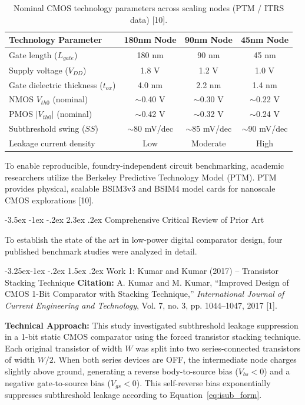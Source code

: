 \documentclass[12pt,a4paper,oneside]{report}
\makeatletter
\renewcommand\section{\@startsection {section}{1}{\z@}%
                                   {-3.5ex \@plus -1ex \@minus -.2ex}%
                                   {2.3ex \@plus.2ex}%
                                   {\normalfont\normalsize\bfseries}}
\renewcommand\subsection{\@startsection{subsection}{2}{\z@}%
                                     {-3.25ex\@plus -1ex \@minus -.2ex}%
                                     {1.5ex \@plus .2ex}%
                                     {\normalfont\normalsize\bfseries\itshape}}
\makeatother
\begin{document}
\begin{table}[H]
\centering
\caption{Nominal CMOS technology parameters across scaling nodes (PTM / ITRS data) [10].}
\label{tab:tech_roadmap}
\vspace{0.2cm}
\begin{tabular}{|l|c|c|c|}
\hline
\textbf{Technology Parameter} & \textbf{180nm Node} & \textbf{90nm Node} & \textbf{45nm Node} \\
\hline
Gate length ($L_{gate}$) & 180 nm & 90 nm & 45 nm \\
\hline
Supply voltage ($V_{DD}$) & 1.8 V & 1.2 V & 1.0 V \\
\hline
Gate dielectric thickness ($t_{ox}$) & 4.0 nm & 2.2 nm & 1.4 nm \\
\hline
NMOS $V_{th0}$ (nominal) & $\sim$0.40 V & $\sim$0.30 V & $\sim$0.22 V \\
\hline
PMOS $|V_{th0}|$ (nominal) & $\sim$0.42 V & $\sim$0.32 V & $\sim$0.24 V \\
\hline
Subthreshold swing ($SS$) & $\sim$80 mV/dec & $\sim$85 mV/dec & $\sim$90 mV/dec \\
\hline
Leakage current density & Low & Moderate & High \\
\hline
\end{tabular}
\end{table}

To enable reproducible, foundry-independent circuit benchmarking, academic researchers utilize the Berkeley Predictive Technology Model (PTM). PTM provides physical, scalable BSIM3v3 and BSIM4 model cards for nanoscale CMOS explorations [10].

\section{Comprehensive Critical Review of Prior Art}

To establish the state of the art in low-power digital comparator design, four published benchmark studies were analyzed in detail.

\subsection{Work 1: Kumar and Kumar (2017) -- Transistor Stacking Technique}
\textbf{Citation:} A. Kumar and M. Kumar, ``Improved Design of CMOS 1-Bit Comparator with Stacking Technique,'' \textit{International Journal of Current Engineering and Technology}, Vol. 7, no. 3, pp. 1044--1047, 2017 [1].

\noindent\textbf{Technical Approach:} This study investigated subthreshold leakage suppression in a 1-bit static CMOS comparator using the forced transistor stacking technique. Each original transistor of width $W$ was split into two series-connected transistors of width $W/2$. When both series devices are OFF, the intermediate node charges slightly above ground, generating a reverse body-to-source bias ($V_{bs} < 0$) and a negative gate-to-source bias ($V_{gs} < 0$). This self-reverse bias exponentially suppresses subthreshold leakage according to Equation~\ref{eq:isub_form}.
\end{document}
